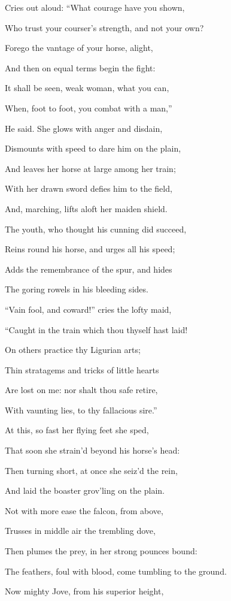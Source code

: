 Cries out aloud: “What courage have you shown,

Who trust your courser’s strength, and not your own?

Forego the vantage of your horse, alight,

And then on equal terms begin the fight:

It shall be seen, weak woman, what you can,

When, foot to foot, you combat with a man,”

He said. She glows with anger and disdain,

Dismounts with speed to dare him on the plain,

And leaves her horse at large among her train;

With her drawn sword defies him to the field,

And, marching, lifts aloft her maiden shield.

The youth, who thought his cunning did succeed,

Reins round his horse, and urges all his speed;

Adds the remembrance of the spur, and hides

The goring rowels in his bleeding sides.

“Vain fool, and coward!” cries the lofty maid,

“Caught in the train which thou thyself hast laid!

On others practice thy Ligurian arts;

Thin stratagems and tricks of little hearts

Are lost on me: nor shalt thou safe retire,

With vaunting lies, to thy fallacious sire.”

At this, so fast her flying feet she sped,

That soon she strain’d beyond his horse’s head:

Then turning short, at once she seiz’d the rein,

And laid the boaster grov’ling on the plain.

Not with more ease the falcon, from above,

Trusses in middle air the trembling dove,

Then plumes the prey, in her strong pounces bound:

The feathers, foul with blood, come tumbling to the ground.

Now mighty Jove, from his superior height,

